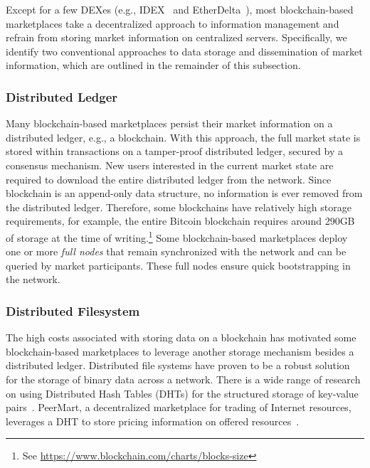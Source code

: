 Except for a few DEXes (e.g., IDEX~\cite{idex} and EtherDelta~\cite{etherdelta}), most blockchain-based marketplaces take a decentralized approach to information management and refrain from storing market information on centralized servers.
Specifically, we identify two conventional approaches to data storage and dissemination of market information, which are outlined in the remainder of this subsection.

\subsubsection{Distributed Ledger}
Many blockchain-based marketplaces persist their market information on a distributed ledger, e.g., a blockchain.
With this approach, the full market state is stored within transactions on a tamper-proof distributed ledger, secured by a consensus mechanism.
New users interested in the current market state are required to download the entire distributed ledger from the network.
Since blockchain is an append-only data structure, no information is ever removed from the distributed ledger.
Therefore, some blockchains have relatively high storage requirements, for example, the entire Bitcoin blockchain requires around 290GB of storage at the time of writing.\footnote{See \url{https://www.blockchain.com/charts/blocks-size}}
Some blockchain-based marketplaces deploy one or more \emph{full nodes} that remain synchronized with the network and can be queried by market participants.
These full nodes ensure quick bootstrapping in the network.

\subsubsection{Distributed Filesystem}
The high costs associated with storing data on a blockchain has motivated some blockchain-based marketplaces to leverage another storage mechanism besides a distributed ledger.
Distributed file systems have proven to be a robust solution for the storage of binary data across a network.
There is a wide range of research on using Distributed Hash Tables (DHTs) for the structured storage of key-value pairs~\cite{maymounkov2002kademlia}.
PeerMart, a decentralized marketplace for trading of Internet resources, leverages a DHT to store pricing information on offered resources~\cite{hausheer2006peermart}.

